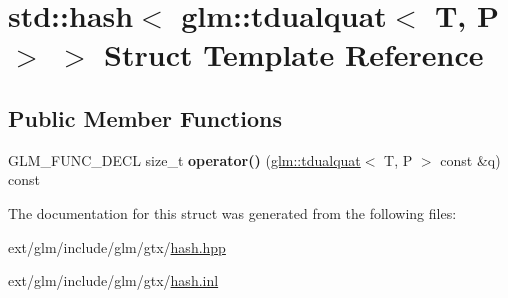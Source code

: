 \hypertarget{structstd_1_1hash_3_01glm_1_1tdualquat_3_01_t_00_01_p_01_4_01_4}{\section{std\-:\-:hash$<$ glm\-:\-:tdualquat$<$ T, P $>$ $>$ Struct Template Reference}
\label{structstd_1_1hash_3_01glm_1_1tdualquat_3_01_t_00_01_p_01_4_01_4}
}
\subsection*{Public Member Functions}
\begin{DoxyCompactItemize}
\item 
\hypertarget{structstd_1_1hash_3_01glm_1_1tdualquat_3_01_t_00_01_p_01_4_01_4_a09f237f8d4232bc751547705e111cb1b}{G\-L\-M\-\_\-\-F\-U\-N\-C\-\_\-\-D\-E\-C\-L size\-\_\-t {\bfseries operator()} (\hyperlink{structglm_1_1tdualquat}{glm\-::tdualquat}$<$ T, P $>$ const \&q) const }\label{structstd_1_1hash_3_01glm_1_1tdualquat_3_01_t_00_01_p_01_4_01_4_a09f237f8d4232bc751547705e111cb1b}

\end{DoxyCompactItemize}


The documentation for this struct was generated from the following files\-:\begin{DoxyCompactItemize}
\item 
ext/glm/include/glm/gtx/\hyperlink{hash_8hpp}{hash.\-hpp}\item 
ext/glm/include/glm/gtx/\hyperlink{hash_8inl}{hash.\-inl}\end{DoxyCompactItemize}
